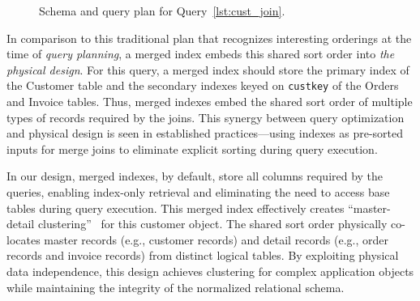 \documentclass[sigconf, pdfa, nonacm]{acmart}
\begin{document}
\begin{figure}[htbp]
\begin{subfigure}[t]{0.48\linewidth}
{%
        }
        \label{fig:cust_join_int_order}
    \end{subfigure}
    \caption{Schema and query plan for Query~\ref{lst:cust_join}.}\label{fig:cust_join}

\end{figure}

In comparison to this traditional plan that recognizes interesting orderings at the time of \textit{query planning}, a merged index embeds this shared sort order into \textit{the physical design}.
For this query, a merged index should store the primary index of the Customer table and the secondary indexes keyed on \texttt{custkey} of the Orders and Invoice tables.
Thus, merged indexes embed the shared sort order of multiple types of records required by the joins.
This synergy between query optimization and physical design is seen in established practices---using indexes as pre-sorted inputs for merge joins to eliminate explicit sorting during query execution.

In our design, merged indexes, by default, store all columns required by the queries, enabling index-only retrieval and eliminating the need to access base tables during query execution.
This merged index effectively creates ``master-detail clustering''~\cite{graefe2007merged} for this customer object. The shared sort order physically co-locates master records (e.g., customer records) and detail records (e.g., order records and invoice records) from distinct logical tables. 
By exploiting physical data independence, this design achieves clustering for complex application objects while maintaining the integrity of the normalized relational schema.
\end{document}
